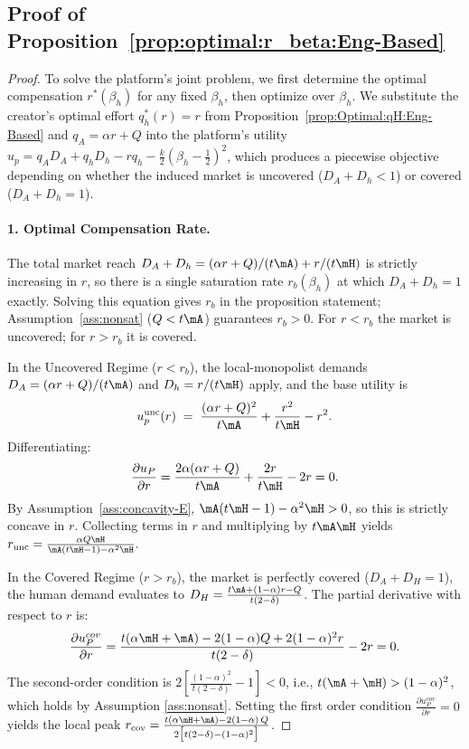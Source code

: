 \subsection*{Proof of Proposition~\ref{prop:optimal:r_beta:Eng-Based}}
\begin{proof}
To solve the platform's joint problem, we first determine the optimal compensation $r^*(\beta_h)$ for any fixed $\beta_h$, then optimize over $\beta_h$. We substitute the creator's optimal effort $q_h^*(r) = r$ from Proposition~\ref{prop:Optimal:qH:Eng-Based} and $q_A = \alpha r + Q$ into the platform's utility $u_p = q_A D_A + q_h D_h - r q_h - \tfrac{k}{2}(\beta_h - \tfrac12)^2$, which produces a piecewise objective depending on whether the induced market is uncovered ($D_A + D_h < 1$) or covered ($D_A + D_h = 1$).

\paragraph{1. Optimal Compensation Rate.}
The total market reach $D_A + D_h = (\alpha r + Q)/(t\mA) + r/(t\mH)$ is strictly increasing in $r$, so there is a single saturation rate $r_b(\beta_h)$ at which $D_A + D_h = 1$ exactly. Solving this equation gives $r_b$ in the proposition statement; Assumption~\ref{ass:nonsat} ($Q < t\mA$) guarantees $r_b > 0$. For $r < r_b$ the market is uncovered; for $r > r_b$ it is covered.
 
In the Uncovered Regime ($r < r_b$), the local-monopolist demands $D_A = (\alpha r + Q)/(t\mA)$ and $D_h = r/(t\mH)$ apply, and the base utility is
\[
    u_p^{\mathrm{unc}}(r) \;=\; \frac{(\alpha r + Q)^2}{t\mA} + \frac{r^2}{t\mH} - r^2.
\]
Differentiating:
\[
\frac{\partial u_P}{\partial r} = \frac{2\alpha(\alpha r + Q)}{t\mA} + \frac{2r}{t\mH} - 2r = 0.
\]
By Assumption~\ref{ass:concavity-E}, $ \mA(t\mH - 1) - \alpha^2 \mH > 0$, so this is strictly concave in $r$. Collecting terms in $r$ and multiplying by $t\mA\mH$ yields 
$
 r_{\mathrm{unc}}  = \frac{\alpha Q \mH}{\mA(t\mH-1)-\alpha^2 \mH}.
$

 
In the Covered Regime ($r > r_b$), the market is perfectly covered ($D_A+D_H=1$), the human demand evaluates to $D_H = \frac{t\mA + (1-\alpha)r - Q}{t(2-\delta)}$. The partial derivative with respect to $r$ is:
\[
\frac{\partial u_P^{cov}}{\partial r} = \frac{t(\alpha\mH + \mA) - 2(1-\alpha)Q + 2(1-\alpha)^2 r}{t(2-\delta)} - 2r = 0.
\]
The second-order condition is $2[\frac{(1-\alpha)^2}{t(2-\delta)} - 1] < 0$, i.e., $t(\mA+\mH) > (1-\alpha)^2$, which holds by Assumption \ref{ass:nonsat}. Setting the first order condition $\frac{\partial u_P^{cov}}{\partial r}=0$ yields the local peak $r_{\mathrm{cov}}=\frac{t(\alpha\mH + \mA) - 2(1-\alpha)\,Q}{2\bigl[t(2-\delta) - (1-\alpha)^2\bigr]}$.



\end{proof}
